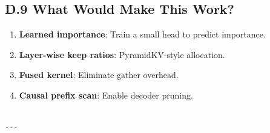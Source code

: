 \subsection{D.9 What Would Make This Work?}

\begin{enumerate}
\item \textbf{Learned importance}: Train a small head to predict importance.
\item \textbf{Layer-wise keep ratios}: PyramidKV-style allocation.
\item \textbf{Fused kernel}: Eliminate gather overhead.
\item \textbf{Causal prefix scan}: Enable decoder pruning.
\end{enumerate}
\begin{lstlisting}

---
\end{lstlisting}